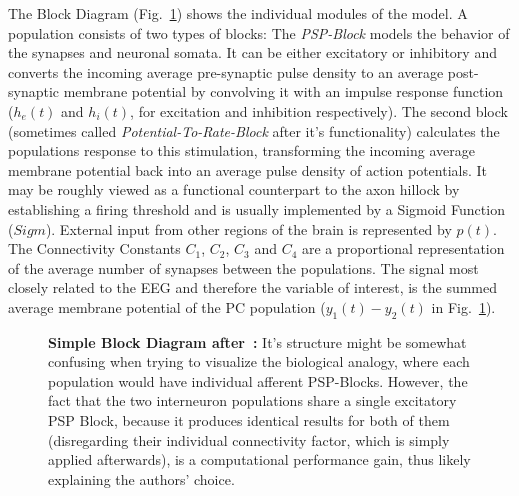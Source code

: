 The Block Diagram (Fig.~\ref{fig:Jansen Rit Simple}) shows the individual modules of the model.
A population consists of two types of blocks:
The \textit{PSP-Block} models the behavior of the synapses and neuronal somata.
It can be either excitatory or inhibitory and converts the incoming average pre-synaptic pulse density to
an average post-synaptic membrane potential by convolving it with an
impulse response function ($h_e(t)$ and $h_i(t)$, for excitation and inhibition respectively).
The second block (sometimes called \textit{Potential-To-Rate-Block} after it's functionality)
calculates the populations response to this stimulation, transforming the incoming
average membrane potential back into an average pulse density of action potentials.
It may be roughly viewed as a functional counterpart to the axon hillock by establishing a firing threshold
and is usually implemented by a Sigmoid Function ($Sigm$).
External input from other regions of the brain is represented by $p(t)$.
The Connectivity Constants $C_1$, $C_2$, $C_3$ and $C_4$ are a proportional representation of the
average number of synapses between the populations.
The signal most closely related to the EEG and therefore the variable of interest,
is the summed average membrane potential of the PC population ($y_1(t)-y_2(t)$ in Fig.~\ref{fig:Jansen Rit Simple}).


\begin{figure}[H]
    \centering
    
    \caption{\textbf{Simple Block Diagram after~\parencite{jansen_electroencephalogram_1995}:}
    It's structure might be somewhat confusing when trying to visualize the biological analogy,
        where each population would have individual afferent PSP-Blocks.
        However, the fact that the two interneuron populations share a single excitatory PSP Block,
        because it produces identical results for both of them (disregarding their individual connectivity factor,
        which is simply applied afterwards), is a computational performance gain,
        thus likely explaining the authors' choice.}
    \label{fig:Jansen Rit Simple}
\end{figure}

